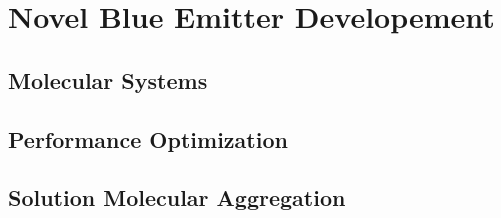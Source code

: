 \documentclass[../thesis.tex]{subfiles}
\begin{document}
\chapter{Novel Blue Emitter Developement}

\section{Molecular Systems}
\section{Performance Optimization}
\section{Solution Molecular Aggregation}



\end{document}
